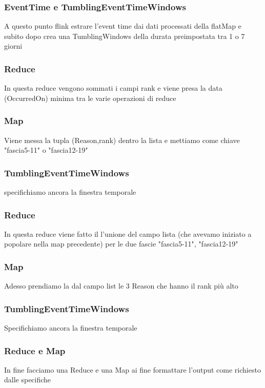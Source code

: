 \documentclass[acmsmall]{acmart}
\begin{document}
\subsubsection{EventTime e TumblingEventTimeWindows}
A questo punto flink estrare l'event time dai dati processati della flatMap e 
subito dopo crea una TumblingWindows della durata preimpostata tra 1 o 7 giorni


\subsubsection{Reduce}
In questa reduce vengono sommati i campi rank e viene presa la data (OccurredOn) minima tra le varie operazioni di reduce 


\subsubsection{Map}
Viene messa la tupla (Reason,rank) dentro la lista e mettiamo come chiave "fascia5-11" o "fascia12-19"

\subsubsection{TumblingEventTimeWindows}
specifichiamo ancora la finestra temporale

\subsubsection{Reduce}
In questa reduce viene fatto il l'unione del campo lista (che avevamo iniziato a popolare nella map precedente) per le due fascie "fascia5-11", "fascia12-19"

\subsubsection{Map}
Adesso prendiamo la dal campo list le 3 Reason che hanno il rank più alto

\subsubsection{TumblingEventTimeWindows}
Specifichiamo ancora la finestra temporale

\subsubsection{Reduce e Map}
In fine facciamo una Reduce e una Map ai fine formattare l'output come richiesto dalle specifiche
\end{document}
